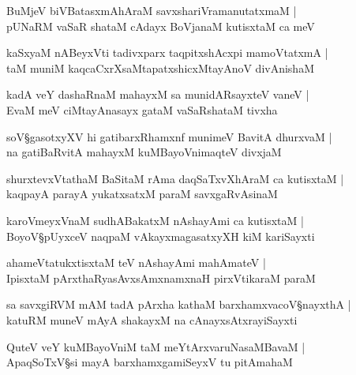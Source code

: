 \begin{shloka}
BuMjeV biVBatasxmAhAraM savxshariVramanutatxmaM |\\
pUNaRM vaSaR shataM cAdayx BoVjanaM kutisxtaM ca meV 
\end{shloka}

\begin{shloka}
kaSxyaM nABeyxVti tadivxparx taqpitxshAcxpi mamoVtatxmA |\\
taM muniM kaqcaCxrXsaMtapatxshicxMtayAnoV divAnishaM 
\end{shloka}

\begin{shloka}
kadA veY dashaRnaM mahayxM sa munidARsayxteV vaneV |\\
EvaM meV ciMtayAnasayx gataM vaSaRshataM tivxha 
\end{shloka}

\begin{shloka}
soV\S gasotxyXV hi gatibarxRhamxnf munimeV BavitA dhurxvaM |\\
na gatiBaRvitA mahayxM kuMBayoVnimaqteV divxjaM 
\end{shloka}

\begin{shloka}
shurxtevxVtathaM BaSitaM rAma daqSaTxvXhAraM ca kutisxtaM |\\
kaqpayA parayA yukatxsatxM paraM savxgaRvAsinaM 
\end{shloka}

\begin{shloka}
karoVmeyxVnaM sudhABakatxM nAshayAmi ca kutisxtaM |\\
BoyoV\S pUyxceV naqpaM vAkayxmagasatxyXH kiM kariSayxti 
\end{shloka}

\begin{shloka}
ahameVtatukxtisxtaM teV nAshayAmi mahAmateV |\\
IpisxtaM pArxthaRyasAvxsAmxnamxnaH pirxVtikaraM paraM 
\end{shloka}

\begin{shloka}
sa savxgiRVM mAM tadA pArxha kathaM barxhamxvacoV\S nayxthA |\\
katuRM muneV mAyA shakayxM na cAnayxsAtxrayiSayxti 
\end{shloka}

\begin{shloka}
QuteV veY kuMBayoVniM taM meYtArxvaruNasaMBavaM |\\
ApaqSoTxV\S si mayA barxhamx\R gamiSeyxV tu pitAmahaM
\end{shloka}

